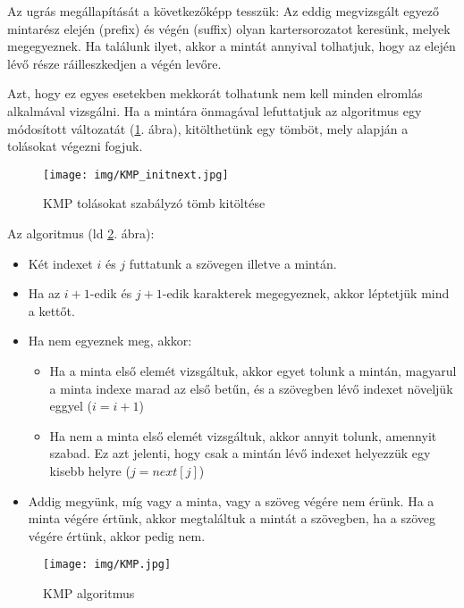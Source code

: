 \documentclass[margin=0px]{article}
\begin{document}
Az ugrás megállapítását a következőképp tesszük: Az eddig megvizsgált egyező mintarész elején (prefix) és végén (suffix) olyan kartersorozatot keresünk, melyek megegyeznek. Ha találunk ilyet, akkor a mintát annyival tolhatjuk, hogy az elején lévő része ráilleszkedjen a végén levőre.

Azt, hogy ez egyes esetekben mekkorát tolhatunk nem kell minden elromlás alkalmával vizsgálni. Ha a mintára önmagával lefuttatjuk az algoritmus egy módosított változatát (\ref{fig:KMP_initnext}. ábra), kitölthetünk egy tömböt, mely alapján a tolásokat végezni fogjuk.

\begin{figure}[H]
    \centering
    \texttt{[image: img/KMP\_initnext.jpg]}
    \caption{KMP tolásokat szabályzó tömb kitöltése}
    \label{fig:KMP_initnext}
\end{figure}

Az algoritmus (ld \ref{fig:KMP}. ábra):
\begin{itemize}
    \item Két indexet $i$ és $j$ futtatunk a szövegen illetve a mintán.
    \item Ha az $i+1$-edik és $j+1$-edik karakterek megegyeznek, akkor léptetjük mind a kettőt.
    \item Ha nem egyeznek meg, akkor:
          \begin{itemize}
              \item Ha a minta első elemét vizsgáltuk, akkor egyet tolunk a mintán, magyarul a minta indexe marad az első betűn, és a szövegben lévő indexet növeljük eggyel ($i=i+1$)
              \item Ha nem a minta első elemét vizsgáltuk, akkor annyit tolunk, amennyit szabad. Ez azt jelenti, hogy csak a mintán lévő indexet helyezzük egy kisebb helyre ($j = next[j]$)
          \end{itemize}
    \item Addig megyünk, míg vagy a minta, vagy a szöveg végére nem érünk. Ha a minta végére értünk, akkor megtaláltuk a mintát a szövegben, ha a szöveg végére értünk, akkor pedig nem.
\end{itemize}

\begin{figure}[H]
    \centering
    \texttt{[image: img/KMP.jpg]}
    \caption{KMP algoritmus}
    \label{fig:KMP}
\end{figure}
\end{document}
